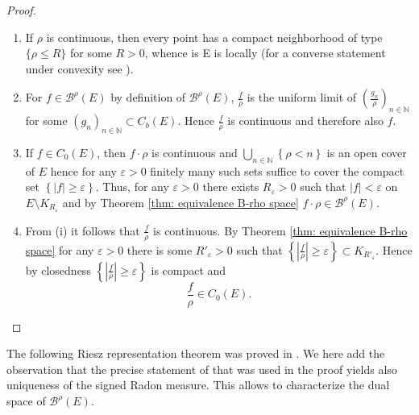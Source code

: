 \documentclass[a4paper,12pt]{article}
\theoremstyle{definition}
\theoremstyle{remark}
\numberwithin{equation}{section}
\numberwithin{theorem}{section}
\begin{document}
\begin{proof}
\begin{enumerate}
\item[(i)]
If $\rho$ is continuous, then 
every point has a compact neighborhood
of type $\{\rho  \leq R \}$ for some $R > 0$, whence is  E is locally (for a converse statement under convexity see \cite[Remark 2.2]{CuT}).

\item [
(i)] For $f\in\mathcal{\mathscr{B}}^{\rho}(E)$ by definition of $\mathcal{\mathscr{B}}^{\rho}(E)$,
$\frac{f}{\rho}$ is the uniform limit of $\left(\frac{g_{n}}{\rho}\right)_{n\in\mathbb{N}}$
for some $\left(g_{n}\right)_{n\in\mathbb{N}}\subset C_{b}(E)$. Hence
$\frac{f}{\rho}$ is continuous and therefore also $f$.

\item [(ii)] If $f\in C_{0}(E)$, then $f\cdot\rho$ is continuous and $\underset{n\in\mathbb{N}}{\bigcup}\left\{ \rho<n\right\} $
is an open cover of $E$ hence for any $\varepsilon>0$ finitely many
such sets suffice to cover the compact set $\left\{ \left|f\right|\geq\varepsilon\right\} $.
Thus, for any $\varepsilon>0$ there exists $R_{\varepsilon}>0$ such
that $\left|f\right|<\varepsilon$ on $E\setminus K_{R_{\varepsilon}}$
and by Theorem \ref{thm: equivalence B-rho space} $f\cdot\rho\in\mathcal{\mathscr{B}}^{\rho}(E)$.

\item [(iii)] From  (i) it follows that $\frac{f}{\rho}$ is continuous. By Theorem \ref{thm: equivalence B-rho space}
for any $\varepsilon>0$ there is some $R'_{\varepsilon}>0$ such
that $\left\{ \left|\frac{f}{\rho}\right|\geq\varepsilon\right\} \subset K_{R'_{\varepsilon}}$.
Hence by closedness $\left\{ \left|\frac{f}{\rho}\right|\geq\varepsilon\right\} $
is compact and
\[
\frac{f}{\rho}\in C_{0}(E).
\]
\end{enumerate}
\end{proof}
The following Riesz representation theorem was proved in \cite{DoT}. We here add the observation that the precise statement of 
\cite[§ 5 Proposition 5]{bourbaki1969elements}
 that was used in the proof yields also uniqueness of the signed Radon measure. This allows to characterize the dual space of $\mathcal{\mathscr{B}}^{\rho}(E)$.
\end{document}
